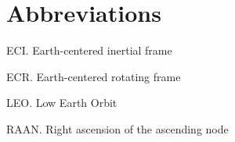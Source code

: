 \documentclass[oneside,12pt]{report}
\begin{document}
\chapter{Abbreviations}\label{Abbreviations}


\noindent ECI.  Earth-centered inertial frame

\vspace{5pt}

\noindent ECR.  Earth-centered rotating frame

\vspace{5pt}

\noindent LEO.  Low Earth Orbit  

\vspace{5pt}

\noindent RAAN. Right ascension of the ascending node

\vspace{5pt}




\renewcommand\bibname{Selected Bibliography Including Cited Works}
\nocite{*}  %

\end{document}
